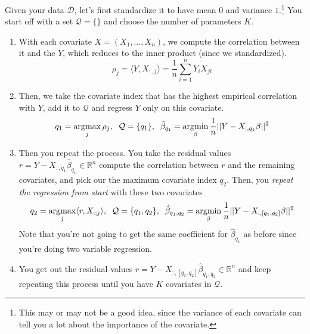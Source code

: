   \begin{definition}
    Given your data $\mathcal{D}$, let's first standardize it to have mean $0$ and variance $1$.\footnote{This may or may not be a good idea, since the variance of each covariate can tell you a lot about the importance of the covariate.} You start off with a set $\mathcal{Q} = \{\}$ and choose the number of parameters $K$. 
    \begin{enumerate}
      \item With each covariate $X = (X_1, \ldots, X_n)$, we compute the correlation between it and the $Y$, which reduces to the inner product (since we standardized). 
      \begin{equation}
        \rho_j = \langle Y, X_{:, j} \rangle = \frac{1}{n} \sum_{i=1}^n Y_i X_{ji}
      \end{equation}

      \item Then, we take the covariate index that has the highest empirical correlation with $Y$, add it to $\mathcal{Q}$ and regress $Y$ only on this covariate. 
      \begin{equation}
        q_1 = \operatorname*{\arg\!\max}_j \rho_j , \;\; \mathcal{Q} = \{q_1\}, \;\; \hat{\beta}_{q_1} = \operatorname*{\arg\!\min}_{\beta} \frac{1}{n} ||Y - X_{:, q_1} \beta||^2 
      \end{equation}

      \item Then you repeat the process. You take the residual values $r = Y - X_{:, q_1} \hat{\beta}_{q_1} \in \mathbb{R}^n$ compute the correlation between $r$ and the remaining covariates, and pick our the maximum covariate index $q_2$. Then, you \textit{repeat the regression from start} with these two covariates 
      \begin{equation}
        q_2 = \operatorname*{\arg\!\max}_j \langle r, X_{: ; j} \rangle , \;\; \mathcal{Q} = \{q_1, q_2\}, \;\; \hat{\beta}_{q_1, q_2} = \operatorname*{\arg\!\min}_{\beta} \frac{1}{n} ||Y - X_{:,[q_1, q_2]} \beta||^2
      \end{equation}
      Note that you're not going to get the same coefficient for $\hat{\beta}_{q_1}$ as before since you're doing two variable regression. 

      \item You get out the residual values $r = Y - X_{:, [q_1, q_2]} \hat{\beta}_{q_1, q_2} \in \mathbb{R}^n$ and keep repeating this process until you have $K$ covariates in $\mathcal{Q}$. 
    \end{enumerate}
  \end{definition}


